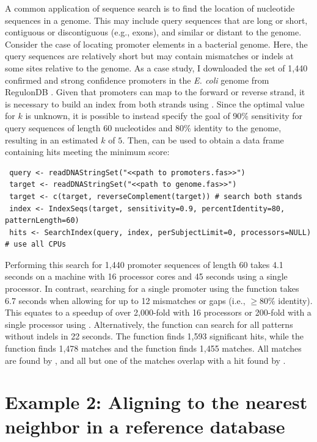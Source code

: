 A common application of sequence search is to find the location of nucleotide sequences in a genome. This may include query sequences that are long or short, contiguous or discontiguous (e.g., exons), and similar or distant to the genome. Consider the case of locating promoter elements in a bacterial genome. Here, the query sequences are relatively short but may contain mismatches or indels at some sites relative to the genome. As a case study, I downloaded the set of 1,440 confirmed and strong confidence promoters in the \textit{E. coli} genome from RegulonDB \citep{RN4283}. Given that promoters can map to the forward or reverse strand, it is necessary to build an index from both strands using . Since the optimal value for \(k\) is unknown, it is possible to instead specify the goal of 90\% sensitivity for query sequences of length 60 nucleotides and 80\% identity to the genome, resulting in an estimated \(k\) of \(5\). Then,  can be used to obtain a data frame containing hits meeting the minimum score:

\begin{verbatim}
 query <- readDNAStringSet("<<path to promoters.fas>>")
 target <- readDNAStringSet("<<path to genome.fas>>")
 target <- c(target, reverseComplement(target)) # search both stands
 index <- IndexSeqs(target, sensitivity=0.9, percentIdentity=80, patternLength=60)
 hits <- SearchIndex(query, index, perSubjectLimit=0, processors=NULL) # use all CPUs
\end{verbatim}

Performing this search for 1,440 promoter sequences of length 60 takes 4.1 seconds on a machine with 16 processor cores and 45 seconds using a single processor. In contrast, searching for a single promoter using the  function  takes 6.7 seconds when allowing for up to 12 mismatches or gaps (i.e., \(\ge 80\%\) identity). This equates to a speedup of over 2,000-fold with 16 processors or 200-fold with a single processor using . Alternatively, the  function  can search for all patterns without indels in 22 seconds. The  function finds 1,593 significant hits, while the  function finds 1,478 matches and the  function finds 1,455 matches. All  matches are found by , and all but one of the  matches overlap with a hit found by .

\section{Example 2: Aligning to the nearest neighbor in a reference database}\label{example-2-aligning-to-the-nearest-neighbor-in-a-reference-database}

